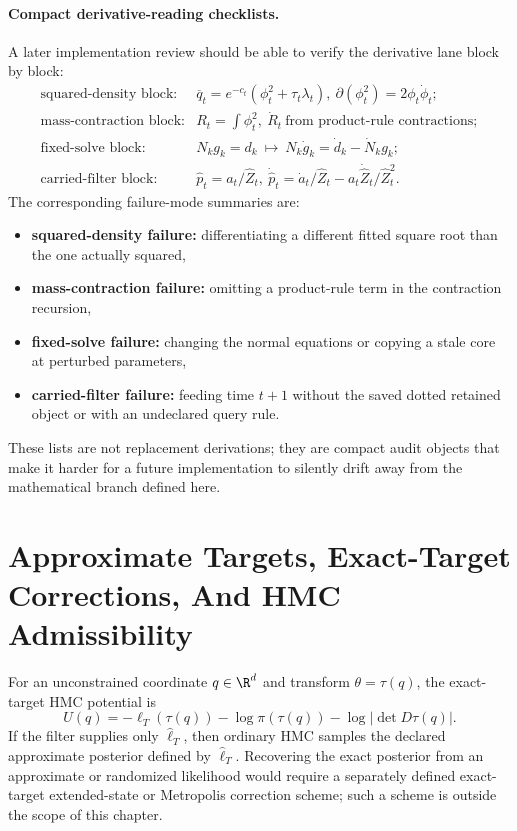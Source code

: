 \paragraph{Compact derivative-reading checklists.}
A later implementation review should be able to verify the derivative lane block
by block:
\begin{equation}
\begin{array}{ll}
\text{squared-density block:} & \overline q_t=e^{-c_t}(\phi_t^2+\tau_t\lambda_t),\ \partial(\phi_t^2)=2\phi_t\dot\phi_t;\\[1mm]
\text{mass-contraction block:} & R_t=\int \phi_t^2,\ \dot R_t\ \text{from product-rule contractions};\\[1mm]
\text{fixed-solve block:} & N_kg_k=d_k\ \mapsto\ N_k\dot g_k=\dot d_k-\dot N_kg_k;\\[1mm]
\text{carried-filter block:} & \widehat p_t=a_t/\widehat Z_t,\ \dot{\widehat p}_t=\dot a_t/\widehat Z_t-a_t\dot{\widehat Z}_t/\widehat Z_t^2.
\end{array}
  \label{eq:bf-hd-ttkr-derivative-checklists}
\end{equation}
The corresponding failure-mode summaries are:
\begin{itemize}[leftmargin=0.28in]
  \item \textbf{squared-density failure:} differentiating a different fitted
  square root than the one actually squared,
  \item \textbf{mass-contraction failure:} omitting a product-rule term in the
  contraction recursion,
  \item \textbf{fixed-solve failure:} changing the normal equations or copying a
  stale core at perturbed parameters,
  \item \textbf{carried-filter failure:} feeding time \(t+1\) without the saved
  dotted retained object or with an undeclared query rule.
\end{itemize}
These lists are not replacement derivations; they are compact audit objects that
make it harder for a future implementation to silently drift away from the
mathematical branch defined here.

\section{Approximate Targets, Exact-Target Corrections, And HMC Admissibility}
\label{sec:bf-hd-fixed-branch-hmc}

For an unconstrained coordinate \(q\in\R^d\) and transform
\(\theta=\tau(q)\), the exact-target HMC potential is
\begin{equation}
  U(q)
  =
  -\ell_T(\tau(q))-
  \log \pi(\tau(q))-
  \log\left|\det D\tau(q)\right|.
  \label{eq:bf-hd-hmc-potential-live}
\end{equation}
If the filter supplies only \(\widehat\ell_T\), then ordinary HMC samples the
declared approximate posterior defined by \(\widehat\ell_T\).  Recovering the
exact posterior from an approximate or randomized likelihood would require a
separately defined exact-target extended-state or Metropolis correction scheme;
such a scheme is outside the scope of this chapter.

